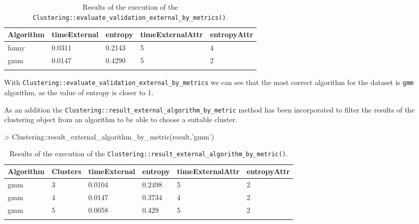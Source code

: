 {\small
\begin{longtable}{| p{1cm} | p{1.6cm} | p{0.8cm} | p{1.9cm} | p{1.8cm} |}
\hline
\scriptsize Algorithm & \scriptsize timeExternal & \scriptsize entropy & \scriptsize timeExternalAttr & \scriptsize entropyAttr \\
\hline
\scriptsize   fanny   & \scriptsize    0.0311    & \scriptsize 0.2143  & \scriptsize        5         & \scriptsize     4 \\
\rowcolor{green} \scriptsize    gmm    & \scriptsize    0.0147    & \scriptsize 0.4290  & \scriptsize        5         & \scriptsize     2  \\
\hline
\caption{Results of the execution of the \texttt{Clustering::evaluate\_validation\_external\_by\_metrics()}.}
\label{tab:evaluatevalidationexternalbymetrics}
\end{longtable}}


With \texttt{Clustering::evaluate\_validation\_external\_by\_metrics} we can see that the most correct algorithm for the dataset is \texttt{gmm} algorithm, as the value of entropy is closer to 1.

As an addition the \texttt{Clustering::result\_external\_algorithm\_by\_metric} method has been incorporated to filter the results of the clustering object from an algorithm to be able to choose a suitable cluster.

\begin{Schunk}
\begin{Sinput}
> Clustering::result_external_algorithm_by_metric(result,'gmm')
\end{Sinput}
\end{Schunk}

{\small
\begin{longtable}{| p{1cm} | p{1.6cm} | p{0.8cm} | p{1.9cm} | p{1.8cm} | p{1.8cm} |}
\hline
\scriptsize Algorithm & \scriptsize Clusters & \scriptsize timeExternal & \scriptsize entropy & \scriptsize timeExternalAttr & \scriptsize entropyAttr  \\
\hline
\scriptsize    gmm    & \scriptsize     3    & \scriptsize    0.0104    & \scriptsize 0.2498  & \scriptsize         5        & \scriptsize       2 \\
\scriptsize    gmm    & \scriptsize     4    & \scriptsize    0.0147    & \scriptsize 0.3734  & \scriptsize         4        & \scriptsize       2 \\
\rowcolor{green}  \scriptsize    gmm    & \scriptsize     5    & \scriptsize    0.0058    & \scriptsize  0.429  & \scriptsize         5        & \scriptsize       2 \\
\hline
\caption{Results of the execution of the \texttt{Clustering::result\_external\_algorithm\_by\_metric()}.}
\label{tab:resultexternalalgorithmbymetric}
\end{longtable}}


